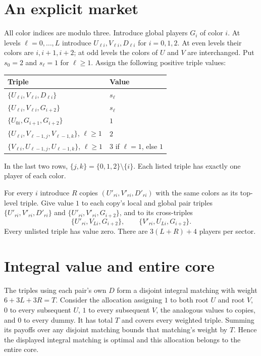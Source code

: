 \documentclass[11pt]{article}
\begin{document}
\section{An explicit market}
All color indices are modulo three. Introduce global players $G_i$ of color
$i$. At levels $\ell=0,\ldots,L$ introduce $U_{\ell i},V_{\ell i},D_{\ell i}$
for $i=0,1,2$. At even levels their colors are $i,i+1,i+2$; at odd levels
the colors of $U$ and $V$ are interchanged. Put $s_0=2$ and $s_\ell=1$
for $\ell\ge1$. Assign the following positive triple values:
\begin{center}
\begin{tabular}{ll}
\toprule
Triple & Value\\
\midrule
$\{U_{\ell i},V_{\ell i},D_{\ell i}\}$ & $s_\ell$\\
$\{U_{\ell i},V_{\ell i},G_{i+2}\}$ & $s_\ell$\\
$\{U_{0i},G_{i+1},G_{i+2}\}$ & $1$\\
$\{U_{\ell i},V_{\ell-1,j},V_{\ell-1,k}\}$, $\ell\ge1$ & $2$\\
$\{V_{\ell i},U_{\ell-1,j},U_{\ell-1,k}\}$, $\ell\ge1$ & $3$ if $\ell=1$, else $1$\\
\bottomrule
\end{tabular}
\end{center}
In the last two rows, $\{j,k\}=\{0,1,2\}\setminus\{i\}$.
Each listed triple has exactly one player of each color.

For every $i$ introduce $R$ copies $(U'_{ri},V'_{ri},D'_{ri})$ with the same
colors as its top-level triple. Give value $1$ to each copy's local and global
pair triples $\{U'_{ri},V'_{ri},D'_{ri}\}$ and
$\{U'_{ri},V'_{ri},G_{i+2}\}$, and to its cross-triples
\[
 \{U'_{ri},V_{Li},G_{i+2}\},\qquad
 \{V'_{ri},U_{Li},G_{i+2}\}.
\]
Every unlisted triple has value zero. There are $3(L+R)+4$ players per sector.

\section{Integral value and entire core}
The triples using each pair's own $D$ form a disjoint integral matching with
weight $6+3L+3R=T$. Consider the allocation assigning $1$ to both root
$U$ and root $V$, $0$ to every subsequent $U$, $1$ to every subsequent $V$,
the analogous values to copies, and $0$ to every dummy. It has total $T$
and covers every weighted triple. Summing its payoffs over any disjoint
matching bounds that matching's weight by $T$. Hence the displayed integral
matching is optimal and this allocation belongs to the entire core.
\end{document}
